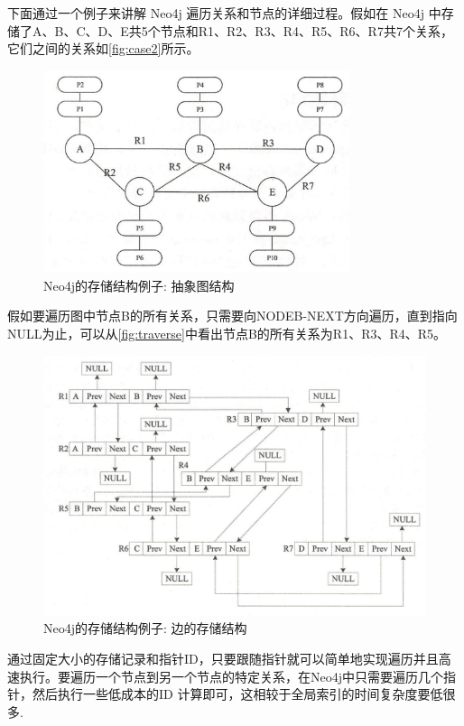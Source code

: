 下面通过一个例子来讲解 Neo4j 遍历关系和节点的详细过程。假如在 Neo4j 中存储了A、B、C、D、E共5个节点和R1、R2、R3、R4、R5、R6、R7共7个关系，它们之间的关系如\cref{fig:case2}所示。
\begin{figure}[!t]
	\centering
	\includegraphics[width=0.8\textwidth]{images/19.png}
	\caption{Neo4j的存储结构例子: 抽象图结构}
	\label{fig:neo4j-case2}
\end{figure}
假如要遍历图中节点B的所有关系，只需要向NODEB-NEXT方向遍历，直到指向NULL为止，可以从\cref{fig:traverse}中看出节点B的所有关系为R1、R3、R4、R5。
\begin{figure}[H]
	\centering
	\includegraphics[width=1\textwidth]{images/20.png}
	\caption{Neo4j的存储结构例子: 边的存储结构}
	\label{fig:neo4j-traverse }
\end{figure}
通过固定大小的存储记录和指针ID，只要跟随指针就可以简单地实现遍历并且高速执行。要遍历一个节点到另一个节点的特定关系，在Neo4j中只需要遍历几个指针，然后执行一些低成本的ID 计算即可，这相较于全局索引的时间复杂度要低很多.




